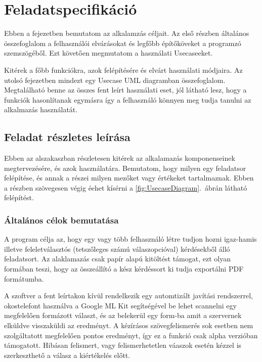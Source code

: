 \chapter{Feladatspecifikáció}
\label{sec:Sepcification}

Ebben a fejezetben bemutatom az alkalamzás céljait. Az első részben általános összefoglalom a felhasználói elvárásokat és legfőbb építőköveket a programzó szemszögéből.
Ezt követően megmutatom a használati Usecaseeket.

Kitérek a főbb funkciókra, azok felépítésére és elvárt használati módjaira.
Az utolsó fejezetben mindezt egy Usecase UML diagramban összefoglalom.
Megtalálható benne az összes fent leírt használati eset, jól látható lesz, hogy a funkciók hasonlítanak egymásra így a felhasználó könnyen meg tudja tanulni az alkalmazás használatát.

\section{Feladat részletes leírása}
\label{sec:SepcificationDescription}

Ebben az alszakaszban részletesen kitérek az alkalamazás komponenseinek megtervezésére, és azok használatára.
Bemutatom, hogy milyen egy feladatsor felépítése, és annak a részei milyen mezőket vagy értékeket tartalmaznak.
Ebben a részben szövegesen végig éehet kísérni a \ref{fig:UsecaseDiagram}.~ábrán látható felépítést.

\subsection{Általános célok bemutatása}


A program célja az, hogy egy vagy több felhasználó létre tudjon hozni igaz-hamis illetve feleletválasztós (tetszőleges számú válaszopcióval) kérdésekből álló feladatsort.
Az alaklamazás csak papír alapú kitöltést támogat, ezt olyan formában teszi, hogy az összeállító a kész kérdéssort ki tudja exportálni PDF formátumba.

A szoftver a fent leírtakon kívül rendelkezik egy automtizált javítási rendszerrel, okostelefont használva a Google ML Kit\cite{MLKit} segítségével be lehet scannelni egy megfelelően formázott választ, és az belekerül egy form-ba amit a szervernek elküldve visszaküldi az eredményt.
A kézírásos szövegfelismerés sok esetben nem szolgáltatott megfelelően pontos eredményt, így ez a funkció csak alpha verzióban támogatott.
Hibásan felismert, vagy felismerhetetlen váaszok esetén kézzel is szerkeszthető a válasz a kiértékelés előtt.

